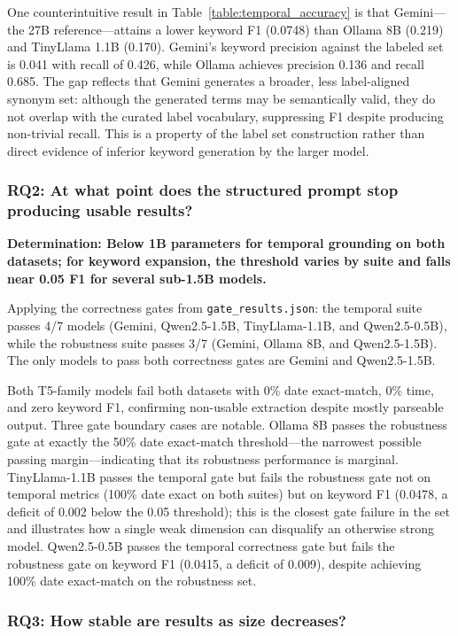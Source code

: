 \documentclass[conference]{IEEEtran}
\begin{document}
One counterintuitive result in Table~\ref{table:temporal_accuracy} is that Gemini---the 27B reference---attains a lower keyword F1 (0.0748) than Ollama 8B (0.219) and TinyLlama 1.1B (0.170). Gemini's keyword precision against the labeled set is 0.041 with recall of 0.426, while Ollama achieves precision 0.136 and recall 0.685. The gap reflects that Gemini generates a broader, less label-aligned synonym set: although the generated terms may be semantically valid, they do not overlap with the curated label vocabulary, suppressing F1 despite producing non-trivial recall. This is a property of the label set construction rather than direct evidence of inferior keyword generation by the larger model.

\subsubsection{RQ2: At what point does the structured prompt stop producing usable results?}

\textbf{Determination: Below 1B parameters for temporal grounding on both datasets; for keyword expansion, the threshold varies by suite and falls near 0.05 F1 for several sub-1.5B models.}

Applying the correctness gates from \texttt{gate\_results.json}: the temporal suite passes 4/7 models (Gemini, Qwen2.5-1.5B, TinyLlama-1.1B, and Qwen2.5-0.5B), while the robustness suite passes 3/7 (Gemini, Ollama 8B, and Qwen2.5-1.5B). The only models to pass both correctness gates are Gemini and Qwen2.5-1.5B.

Both T5-family models fail both datasets with 0\% date exact-match, 0\% time, and zero keyword F1, confirming non-usable extraction despite mostly parseable output. Three gate boundary cases are notable. Ollama 8B passes the robustness gate at exactly the 50\% date exact-match threshold---the narrowest possible passing margin---indicating that its robustness performance is marginal. TinyLlama-1.1B passes the temporal gate but fails the robustness gate not on temporal metrics (100\% date exact on both suites) but on keyword F1 (0.0478, a deficit of 0.002 below the 0.05 threshold); this is the closest gate failure in the set and illustrates how a single weak dimension can disqualify an otherwise strong model. Qwen2.5-0.5B passes the temporal correctness gate but fails the robustness gate on keyword F1 (0.0415, a deficit of 0.009), despite achieving 100\% date exact-match on the robustness set.

\subsubsection{RQ3: How stable are results as size decreases?}
\end{document}
